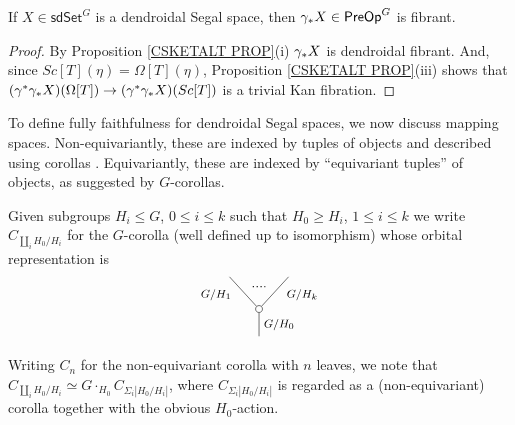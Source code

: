 \documentclass[a4paper,10pt
 ,draft
]{article}%
\begin{document}
\begin{proposition}\label{DSSFIB_PROP}
If $X \in \mathsf{sdSet}^G$ is a dendroidal Segal space, then
$\gamma_{\**}X \in \mathsf{PreOp}^G$ is fibrant.
\end{proposition}

\begin{proof}
	By Proposition \ref{CSKETALT PROP}(i) $\gamma_{\**}X$ is dendroidal fibrant. And, since 
	$Sc[T](\eta)=\Omega[T](\eta)$,
	Proposition \ref{CSKETALT PROP}(iii) shows that 
	$(\gamma^{\**}\gamma_{\**}X)(\Omega[T]) \to 
	(\gamma^{\**} \gamma_{\**}X)(Sc[T])$
	is a trivial Kan fibration.
\end{proof}




To define fully faithfulness for dendroidal Segal spaces, we now
discuss mapping spaces. Non-equivariantly, these are indexed by tuples of objects and described using corollas \cite[3.6]{CM13a}.
Equivariantly, these are indexed by ``equivariant tuples'' of objects, as suggested by $G$-corollas.


\begin{notation}\label{GCOR NOT}
Given subgroups $H_i \leq G$, $0\leq i \leq k$ such that
$H_0 \geq H_i$, $1 \leq i \leq k$ we write
$C_{\amalg_i H_0/H_i}$ for the $G$-corolla (well defined up to isomorphism)
whose orbital representation is
\[
\begin{tikzpicture}
[grow=up,auto,level distance=2.3em,every node/.style = {font=\footnotesize},dummy/.style={circle,draw,inner sep=0pt,minimum size=1.75mm}]
	\node at (0,0) {}
		child{node [dummy] {}
			child{
			edge from parent node [swap,near end] {$G/H_k$} node [name=Kn] {}}
			child{
			edge from parent node [near end] {$G/H_1$}
node [name=Kone,swap] {}}
		edge from parent node [swap] {$G/H_0$}
		};
		\draw [dotted,thick] (Kone) -- (Kn) ;
\end{tikzpicture}
\]
Writing $C_n$ for the non-equivariant corolla with $n$ leaves, we note that
$C_{\amalg_i H_0/H_i} \simeq 
G \cdot_{H_0} C_{\Sigma_i |H_0/H_i|}$,
where $C_{\Sigma_i |H_0/H_i|}$ is regarded as a (non-equivariant) corolla together with the obvious $H_0$-action.
\end{notation}
\end{document}
